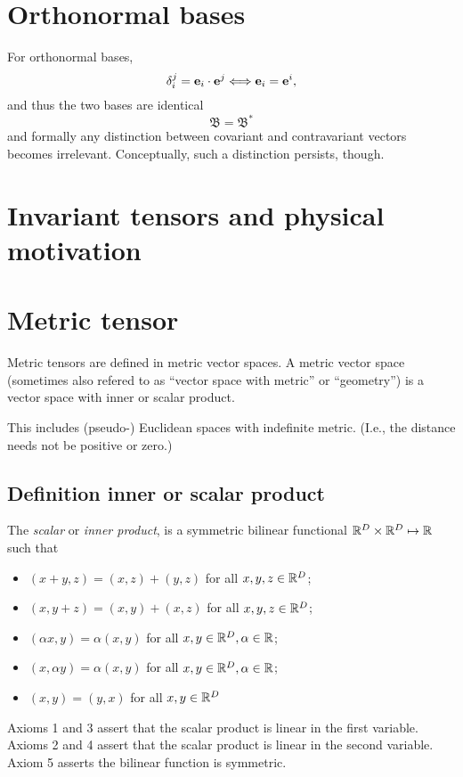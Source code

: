 \section{Orthonormal bases}
For orthonormal bases,
\begin{equation}
\delta_i^j = {\bf e}_i\cdot {\bf e}^j
\Longleftrightarrow
{\bf e}_i= {\bf e}^i  ,
\end{equation}
and thus the two bases are identical
\begin{equation}
{\mathfrak B}={\mathfrak B}^\ast
\end{equation}
and  formally any distinction between covariant and contravariant vectors becomes
irrelevant. Conceptually, such a distinction persists, though.



\section{Invariant tensors and physical motivation}

\section{Metric tensor}

Metric tensors are defined in metric vector spaces.
A metric vector space (sometimes also refered to
as ``vector space with metric'' or ``geometry'')
is a vector space with inner or scalar product.

This includes (pseudo-) Euclidean spaces with indefinite metric.
(I.e., the distance needs not be positive or zero.)


\subsection{Definition inner or scalar product}


The {\em scalar} or {\em inner product},
is a symmetric bilinear functional
 ${\Bbb R}^D\times {\Bbb R}^D\mapsto {\Bbb R}$
such that
\begin{itemize}
\item
$(x+y,z)=(x,z)+(y,z)$ for all $x,y,z \in {\Bbb R}^D$;
\item
$(x,y+z)=(x,y)+(x,z)$ for all $x,y,z \in {\Bbb R}^D$;
\item
$(\alpha x,y)=\alpha (x,y)$ for all $x,y \in {\Bbb R}^D, \alpha \in {\Bbb R}$;
\item
$(x,\alpha y)=\alpha (x,y)$ for all $x,y \in {\Bbb R}^D, \alpha \in {\Bbb R}$;
\item
$(x,y)={(y,x)} $ for all $x,y \in {\Bbb R}^D$
\end{itemize}
Axioms 1 and 3 assert that the scalar product is linear in the first variable.
Axioms 2 and 4 assert that the scalar product is linear in the second variable.
Axiom 5 asserts the bilinear function is symmetric.



